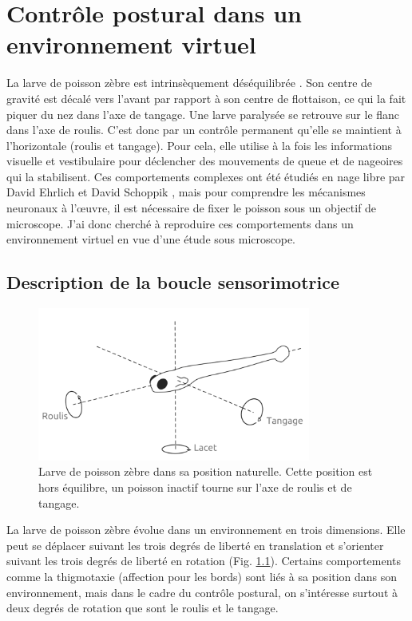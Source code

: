 \chapter[Contrôle postural en réalité virtuelle]{Contrôle postural dans un environnement virtuel}\label{chapII}

La larve de poisson zèbre est intrinsèquement déséquilibrée \cite{bagnall_development_2018}. Son centre de gravité est décalé vers l'avant par rapport à son centre de flottaison, ce qui la fait piquer du nez dans l'axe de tangage. Une larve paralysée se retrouve sur le flanc dans l'axe de roulis. C'est donc par un contrôle permanent qu'elle se maintient à l'horizontale (roulis et tangage). Pour cela, elle utilise à la fois les informations visuelle et vestibulaire pour déclencher des mouvements de queue et de nageoires qui la stabilisent. Ces comportements complexes ont été étudiés en nage libre par David Ehrlich et David Schoppik \cite{ehrlich_control_2017}\cite{ehrlich_balance_2018}\cite{ehrlich_primal_2019}, mais pour comprendre les mécanismes neuronaux à l'œuvre, il est nécessaire de fixer le poisson sous un objectif de microscope. J'ai donc cherché à reproduire ces comportements dans un environnement virtuel en vue d'une étude sous microscope.

\section{Description de la boucle sensorimotrice}

\begin{figure}[b]
    \centering
    \includegraphics[width=0.8\textwidth]{./files/fish.png}
    \caption{Larve de poisson zèbre dans sa position naturelle. Cette position est hors équilibre, un poisson inactif tourne sur l'axe de roulis et de tangage.
    \label{FIGroulistangage}}
    \end{figure}

La larve de poisson zèbre évolue dans un environnement en trois dimensions. Elle peut se déplacer suivant les trois degrés de liberté en translation et s'orienter suivant les trois degrés de liberté en rotation (Fig. \ref{FIGroulistangage}). Certains comportements comme la thigmotaxie (affection pour les bords) sont liés à sa position dans son environnement, mais dans le cadre du contrôle postural, on s'intéresse surtout à deux degrés de rotation que sont le roulis et le tangage.


